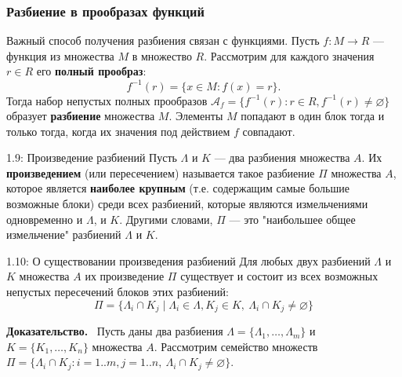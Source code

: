 \documentclass[a4paper,12pt]{article}
\newcommand{\myproof}{\textbf{Доказательство.}\ }
\begin{document}
\subsubsection*{Разбиение в прообразах функций}
Важный способ получения разбиения связан с функциями. Пусть $f: M \to R$ — функция из множества $M$ в множество $R$. Рассмотрим для каждого значения $r \in R$ его \textbf{полный прообраз}:
\[
f^{-1}(r) = \{ x \in M : f(x) = r \}.
\]
Тогда набор непустых полных прообразов $\mathcal{A}_f = \{ f^{-1}(r) : r \in R, f^{-1}(r) \neq \varnothing \}$ образует \textbf{разбиение} множества $M$. Элементы $M$ попадают в один блок тогда и только тогда, когда их значения под действием $f$ совпадают.


\begin{definitionbox}{1.9: Произведение разбиений}
	Пусть $\Lambda$ и $K$ — два разбиения множества $A$. Их \textbf{произведением} (или пересечением) называется такое разбиение $\Pi$ множества $A$, которое является \textbf{наиболее крупным} (т.е. содержащим самые большие возможные блоки) среди всех разбиений, которые являются измельчениями одновременно и $\Lambda$, и $K$. Другими словами, $\Pi$ — это "наибольшее общее измельчение" разбиений $\Lambda$ и $K$.
\end{definitionbox}

\begin{theorembox}{1.10: О существовании произведения разбиений}
	Для любых двух разбиений $\Lambda$ и $K$ множества $A$ их произведение $\Pi$ существует и состоит из всех возможных непустых пересечений блоков этих разбиений:
	\[ \Pi = \{ \Lambda_i \cap K_j \mid \Lambda_i \in \Lambda, K_j \in K,\ \Lambda_i \cap K_j \neq \varnothing \} \]
\end{theorembox}

\myproof
Пусть даны два разбиения $\Lambda = \{\Lambda_1, \dots, \Lambda_m\}$ и $K = \{K_1, \dots, K_n\}$ множества $A$. Рассмотрим семейство множеств $\Pi = \{\Lambda_i \cap K_j : i = 1..m, j = 1..n,\ \Lambda_i \cap K_j \neq \varnothing\}$.
\end{document}

